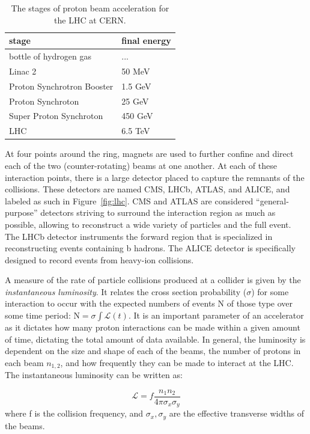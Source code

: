 \begin{table}
\centering
\caption{The stages of proton beam acceleration for the LHC at CERN.}
\label{tab:stages}
\begin{tabular}{ll}
\hline\hline
stage & final energy\\
\hline
bottle of hydrogen gas & ...\\
Linac 2 & 50 MeV\\
Proton Synchrotron Booster & 1.5 GeV\\
Proton Synchroton & 25 GeV\\
Super Proton Synchroton & 450 GeV\\
LHC & 6.5 TeV\\
\hline
\hline
\end{tabular}
\end{table}

At four points around the ring, magnets are used to further confine and direct each of the two (counter-rotating) beams at one another. At each of these interaction points, there is a large detector placed to capture the remnants of the collisions. These detectors are named CMS, LHCb, ATLAS, and ALICE, and labeled as such in Figure~\ref{fig:lhc}. CMS and ATLAS are considered ``general-purpose'' detectors striving to surround the interaction region as much as possible, allowing to reconstruct a wide variety of particles and the full event. The LHCb detector instruments the forward region that is specialized in reconstructing events containing b hadrons.  The ALICE detector is specifically designed to record events from heavy-ion collisions.

A measure of the rate of particle collisions produced at a collider is given by the \textit{instantaneous luminosity}. It relates the cross section probability ($\sigma$) for some interaction to occur with the expected numbers of events N of those type over some time period: $\textrm{N} = \sigma \int \mathcal{L}(t)$. It is an important parameter of an accelerator as it dictates how many proton interactions can be made within a given amount of time, dictating the total amount of data available. In general, the luminosity is dependent on the size and shape of each of the beams, the number of protons in each beam $n_{1,2}$, and how frequently they can be made to interact at the LHC. The instantaneous luminosity can be written as:

\begin{equation}
\label{eq:lumi}
\mathcal{L} = f \frac{n_{1} n_{2}}  { 4 \pi \sigma_{x} \sigma_{y}}
\end{equation}
where f is the collision frequency, and $\sigma_{x}, \sigma_{y}$ are the effective transverse widths of the beams.

